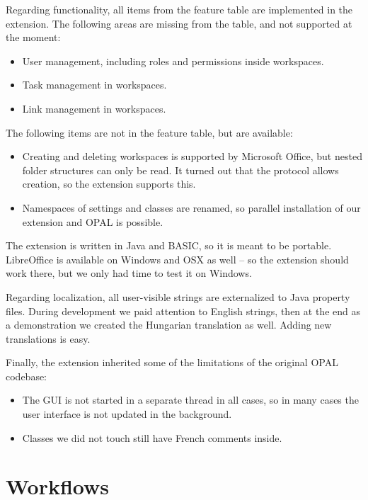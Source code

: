Regarding functionality, all items from the feature table are implemented in
the extension. The following areas are missing from the table, and not
supported at the moment:

\begin{itemize}
\item User management, including roles and permissions inside workspaces.
\item Task management in workspaces.
\item Link management in workspaces.
\end{itemize}

The following items are not in the feature table, but are available:

\begin{itemize}
\item Creating and deleting workspaces is supported by Microsoft Office, but nested
folder structures can only be read. It turned out that the protocol allows
creation, so the extension supports this.
\item Namespaces of settings and classes are renamed, so parallel installation
of our extension and OPAL is possible.
\end{itemize}

The extension is written in Java and BASIC, so it is meant to be portable.
LibreOffice is available on Windows and OSX as well -- so the extension should
work there, but we only had time to test it on Windows.

Regarding localization, all user-visible strings are externalized to Java
property files. During development we paid attention to English strings, then at
the end as a demonstration we created the Hungarian translation as well. Adding
new translations is easy.

Finally, the extension inherited some of the limitations of the original OPAL
codebase:

\begin{itemize}
\item The GUI is not started in a separate thread in all cases, so in many cases
the user interface is not updated in the background.
\item Classes we did not touch still have French comments inside.
\end{itemize}

\section{Workflows}

